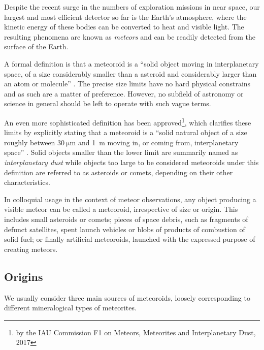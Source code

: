         Despite the recent surge in the numbers of exploration missions in near space,
        our largest and most efficient detector so far is the Earth's atmosphere,
        where the kinetic energy of these bodies can be converted to heat and visible light.
        The resulting phenomena are known as \emph{meteors} and can be readily detected from the surface of the Earth.

        A formal definition is that a meteoroid is a ``solid object moving in interplanetary space,
        of a size considerably smaller than a asteroid and considerably larger than an atom or molecule'' \citep{imo-glossary}.
        The precise size limits have no hard physical constrains and as such are a matter of preference.
        However, no subfield of astronomy or science in general should be left to operate with such vague terms.

        An even more sophisticated definition has been approved\footnote{by the IAU Commission F1 on Meteors, Meteorites and Interplanetary Dust, 2017},
        which clarifies these limits by explicitly stating that a meteoroid is a ``solid natural object
        of a size roughly between $\SI{30}{\micro\metre}$ and \SI{1}{\metre} moving in, or coming from, interplanetary space'' \citep{imo-definitions}.
        Solid objects smaller than the lower limit are summarily named as \emph{interplanetary dust} while objects
        too large to be considered meteoroids under this definition are referred to as
        asteroids or comets, depending on their other characteristics.

        In colloquial usage in the context of meteor observations, any object producing a visible meteor can be called a meteoroid,
        irrespective of size or origin. This includes small asteroids or comets; pieces of space debris,
        such as fragments of defunct satellites, spent launch vehicles or blobs of products of combustion of solid fuel;
        or finally artificial meteoroids, launched with the expressed purpose of creating meteors.

        \subsection{Origins} \label{iamo}
            We usually consider three main sources of meteoroids, loosely corresponding to different
            mineralogical types of meteorites.

